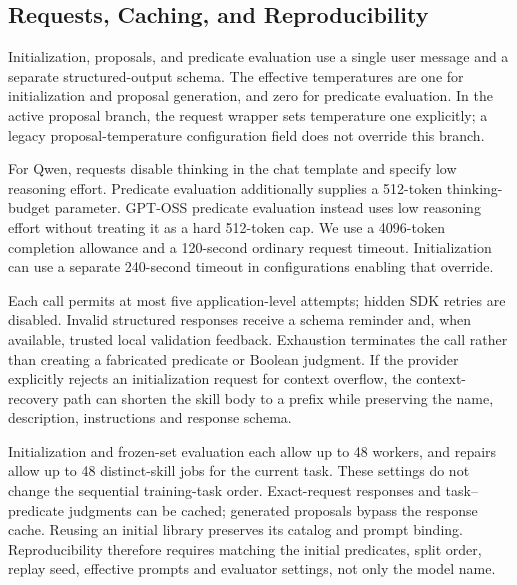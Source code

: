 \subsection{Requests, Caching, and Reproducibility}
\label{app:implementation-runtime}
Initialization, proposals, and predicate evaluation use a single user message and a separate structured-output schema. The effective temperatures are one for initialization and proposal generation, and zero for predicate evaluation. In the active proposal branch, the request wrapper sets temperature one explicitly; a legacy proposal-temperature configuration field does not override this branch.

For Qwen, requests disable thinking in the chat template and specify low reasoning effort. Predicate evaluation additionally supplies a 512-token thinking-budget parameter. GPT-OSS predicate evaluation instead uses low reasoning effort without treating it as a hard 512-token cap. We use a 4096-token completion allowance and a 120-second ordinary request timeout. Initialization can use a separate 240-second timeout in configurations enabling that override.

Each call permits at most five application-level attempts; hidden SDK retries are disabled. Invalid structured responses receive a schema reminder and, when available, trusted local validation feedback. Exhaustion terminates the call rather than creating a fabricated predicate or Boolean judgment. If the provider explicitly rejects an initialization request for context overflow, the context-recovery path can shorten the skill body to a prefix while preserving the name, description, instructions and response schema.

Initialization and frozen-set evaluation each allow up to 48 workers, and repairs allow up to 48 distinct-skill jobs for the current task. These settings do not change the sequential training-task order. Exact-request responses and task--predicate judgments can be cached; generated proposals bypass the response cache. Reusing an initial library preserves its catalog and prompt binding. Reproducibility therefore requires matching the initial predicates, split order, replay seed, effective prompts and evaluator settings, not only the model name.
